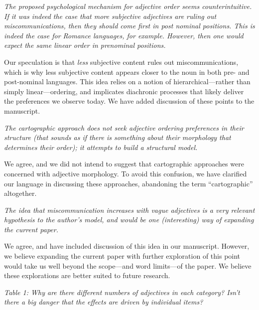 \documentclass[12pt]{article}
\newcommand{\ndg}[1]{\textcolor{Green}{[ndg: #1]}}
\begin{document}
\item \emph{The proposed psychological mechanism for adjective order seems counterintuitive. If it was indeed the case that more subjective adjectives are ruling out miscommunications, then they should come first in post nominal positions. This is indeed the case for Romance languages, for example. However, then one would expect the same linear order in prenominal positions.}

Our speculation is that \emph{less} subjective content rules out miscommunications, which is why less subjective content appears closer to the noun in both pre- and post-nominal languages. This idea relies on a notion of hierarchical---rather than simply linear---ordering, and implicates 
diachronic processes that likely deliver the preferences we observe today. We have added discussion of these points to the manuscript.

\item \emph{The cartographic approach does not seek adjective ordering preferences in their structure (that sounds as if there is something about their morphology that determines their order); it attempts to build a structural model.}

We agree, and we did not intend to suggest that cartographic approaches were concerned with adjective morphology. To avoid this confusion, we have clarified our language in discussing these approaches, abandoning the term ``cartographic'' altogether.

\item \emph{The idea that miscommunication increases with vague adjectives is a very relevant hypothesis to the author's model, and would be one (interesting) way of expanding the current paper.}

We agree, and have included discussion of this idea in our manuscript. However, we believe expanding the current paper with further exploration of this point would take us well beyond the scope---and word limits---of the paper. We believe these explorations are better suited to future research.

\item \emph{Table 1: Why are there different numbers of adjectives in each category? Isn't there a big danger that the effects are driven by individual items?}
\end{document}
